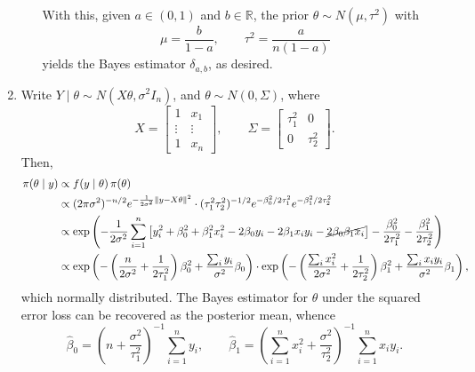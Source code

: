 \documentclass[11pt]{article}
\newcommand{\R}{\mathbb{R}}
\newcommand{\norm}[1]{\Vert #1 \Vert}
\begin{document}
\begin{enumerate}
\begin{enumerate}
            With this, given $a \in (0, 1)$ and $b \in \R$, the prior $\theta \sim
            N(\mu, \tau^2)$ with \[
                \mu = \frac{b}{1 - a}, \qquad
                \tau^2 = \frac{a}{n(1 - a)}
            \] yields the Bayes estimator $\delta_{a, b}$, as desired.
        \end{enumerate}



        \item Write $Y \mid \theta \sim N(X\theta, \sigma^2 I_n)$, and $\theta
        \sim N(0, \Sigma)$, where \[
            X = \begin{bmatrix}
                1 & x_1 \\
                \vdots & \vdots \\
                1 & x_n
            \end{bmatrix}, \qquad
            \Sigma = \begin{bmatrix}
                \tau_1^2 & 0 \\
                0 & \tau_2^2
            \end{bmatrix}.
        \] Then, \begin{align*}
            \pi(\theta\mid y)
                &\propto f(y\mid\theta)\, \pi(\theta) \\
                &\propto (2\pi\sigma^2)^{-n/2} e^{-\frac{1}{2\sigma^2}\norm{y - X\theta}^2} \cdot (\tau_1^2\tau_2^2)^{-1/2} e^{-\beta_0^2 /2\tau_1^2} e^{-\beta_1^2 /2\tau_2^2} \\
                &\propto \exp\left(-\frac{1}{2\sigma^2} \sum_{i = 1}^n \left[y_i^2 + \beta_0^2 + \beta_1^2x_i^2 - 2\beta_0 y_i - 2 \beta_1x_iy_i - \cancel{2\beta_0\beta_1x_i}\right] -\frac{\beta_0^2}{2\tau_1^2} - \frac{\beta_1^2}{2\tau_2^2}\right) \\
                &\propto \exp\left(-\left(\frac{n}{2\sigma^2} + \frac{1}{2\tau_1^2}\right)\beta_0^2 + \frac{\sum_i y_i}{\sigma^2}\beta_0\right) \cdot
                    \exp\left(-\left(\frac{\sum_i x_i^2}{2\sigma^2} + \frac{1}{2\tau_2^2}\right)\beta_1^2 + \frac{\sum_i x_iy_i}{\sigma^2}\beta_1\right),
        \end{align*}
        which normally distributed.
        The Bayes estimator for $\theta$ under the squared error loss can be
        recovered as the posterior mean, whence \[
            \hat{\beta}_0 = \left(n + \frac{\sigma^2}{\tau_1^2}\right)^{-1} \sum_{i = 1}^n y_i, \qquad
            \hat{\beta}_1 = \left(\sum_{i = 1}^n x_i^2 + \frac{\sigma^2}{\tau_2^2}\right)^{-1} \sum_{i = 1}^n x_i y_i.
        \]




\end{enumerate}
\end{document}
